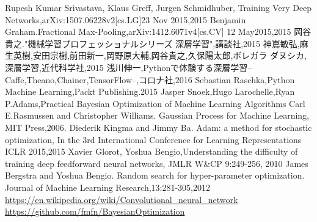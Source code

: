 \begin{thebibliography}{99}
  Rupesh Kumar Srivastava, Klaus Greff, Jurgen Schmidhuber, Training Very Deep Networks,arXiv:1507.06228v2[cs.LG]23 Nov 2015,2015
  Benjamin Graham.Fractional Max-Pooling,arXiv:1412.6071v4[cs.CV] 12 May2015,2015
  岡谷貴之."機械学習プロフェッショナルシリーズ 深層学習",講談社,2015
  神嶌敏弘,麻生英樹,安田宗樹,前田新一,岡野原大輔,岡谷貴之,久保陽太郎,ボレガラ ダヌシカ,深層学習,近代科学社,2015
  浅川伸一,Pythonで体験する深層学習--Caffe,Theano,Chainer,TensorFlow--,コロナ社,2016
    Sebastian Raschka,Python Machine Learning,Packt Publishing.2015
  Jasper Snoek,Hugo Larochelle,Ryan P.Adams,Practical Bayesian Optimization of Machine Learning Algorithms
  Carl E.Rasmussen and Christopher Williams. Gaussian Process for Machine Learning, MIT Press,2006.
  Diederik Kingma and Jimmy Ba. Adam: a method for stochastic optimization, In the 3rd International Conference for Learning Representations ICLR 2015,2015
  Xavier Glorot, Yoshua Bengio,Understanding the difficulty of training deep feedforward neural networks, JMLR W\&CP 9:249-256, 2010
   James Bergstra and Yoshua Bengio. Random search for hyper-parameter optimization. Journal of Machine Learning Research,13:281-305,2012
   \url{https://en.wikipedia.org/wiki/Convolutional_neural_network}
   \url{https://github.com/fmfn/BayesianOptimization}
\end{thebibliography}
 



